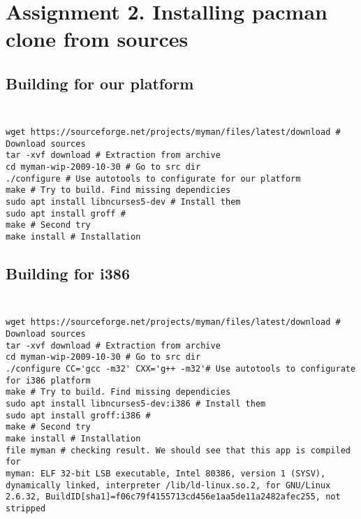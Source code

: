 \documentclass[10pt]{article}
\begin{document}
\section{Assignment 2. Installing pacman clone from sources    \newline}
\subsection{Building for our platform \\ \\}
\begin{verbatim}
wget https://sourceforge.net/projects/myman/files/latest/download # Download sources
tar -xvf download # Extraction from archive
cd myman-wip-2009-10-30 # Go to src dir
./configure # Use autotools to configurate for our platform
make # Try to build. Find missing dependicies
sudo apt install libncurses5-dev # Install them
sudo apt install groff # 
make # Second try
make install # Installation
\end{verbatim}

\subsection{Building for i386 \\ \\}
\begin{verbatim}
wget https://sourceforge.net/projects/myman/files/latest/download # Download sources
tar -xvf download # Extraction from archive
cd myman-wip-2009-10-30 # Go to src dir
./configure CC='gcc -m32' CXX='g++ -m32'# Use autotools to configurate for i386 platform
make # Try to build. Find missing dependicies
sudo apt install libncurses5-dev:i386 # Install them
sudo apt install groff:i386 # 
make # Second try
make install # Installation
file myman # checking result. We should see that this app is compiled for 
myman: ELF 32-bit LSB executable, Intel 80386, version 1 (SYSV), dynamically linked, interpreter /lib/ld-linux.so.2, for GNU/Linux 2.6.32, BuildID[sha1]=f06c79f4155713cd456e1aa5de11a2482afec255, not stripped
\end{verbatim}
\end{document}
